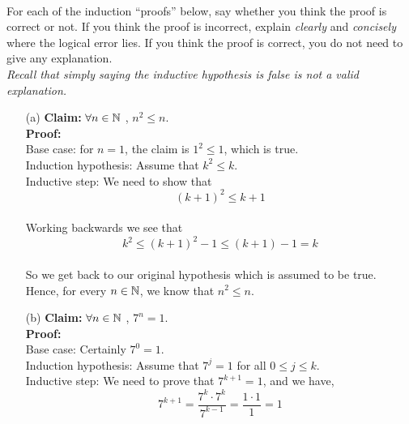 \documentclass[11pt]{article}
\newif\ifsolutions
\begin{document}
\begin{qunlist}
\ifsolutions
\textbf{Solutions:}
You can always get to 1. We can prove this by strong induction. If $n=1$, we are done.  If $n=2$, we add 2 and divide by 4, and then are done.  For our inductive hypothesis, we assume we can get to 1 from any number less than $n$. Then if $n$ is dividible by 4, dividing $n$ by 4 reduces the problem to one we have already solved.  If $n$ is divisible by 2 but not 4, $(n+2)/4 < n$, so we've again reduced the problem to one we have already solved. \\

So the remaining case is if $n$ is odd.  In this case, $3n-1$ will be even, so then we would either divide by 4, or add 2 and divide by 4, in either case $(3n-1)/4$ and $(3n+1)/4$ are both less than $n$ if $n \geq 2$.
\fi



 \\
For each of the induction ``proofs'' below, say whether you think the proof is correct or not.
If you think the proof is incorrect, explain \textit{clearly} and \textit{concisely} where the logical error lies.
If you think the proof is correct, you do not need to give any explanation. \\
\textit{Recall that simply saying the inductive hypothesis is false is not a valid explanation.}

\begin{itemize}
\item[(a)] \textbf{Claim:} $\forall n \in \mathbb{N}$ , $n^2 \leq n$. \\
\textbf{Proof:} \\
Base case: for $n = 1$, the claim is $1^2 \leq 1$, which is true. \\
Induction hypothesis: Assume that $k^2 \leq k$. \\
Inductive step: We need to show that \[ (k+1)^2 \leq k+1\] \\
Working backwards we see that \[ k^2 \leq (k+1)^2 - 1 \leq (k+1) - 1 = k \] \\
So we get back to our original hypothesis which is assumed to be true.\\
Hence, for every $n \in \mathbb{N}$, we know that $n^2 \leq n$. 

\ifsolutions
\textbf{Solutions:}
\fi


\item[(b)]\textbf{Claim:} $\forall n \in \mathbb{N}$ , $7^n = 1$. \\
\textbf{Proof:} \\
Base case: Certainly $7^0 = 1$. \\
Induction hypothesis: Assume that $7^j = 1$ for all $0\leq j \leq k$.\\
Inductive step: We need to prove that $7^{k+1} = 1$, and we have,
\[ 7^{k+1} = \frac{7^k \cdot 7^k}{7^{k-1}} = \frac{1 \cdot 1}{1} = 1\]


\end{itemize}
\end{qunlist}
\end{document}
